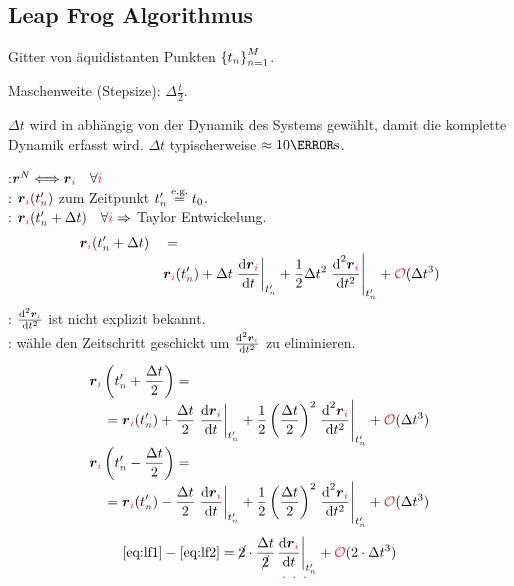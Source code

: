 \subsection{Leap Frog Algorithmus}
\label{subsec:LeapFrogAlgorithmus}
\begin{sectionbox}\nospacing
  \begin{numberlist}
    \item Gitter von äquidistanten Punkten $\left\{t_{\idxn}\right\}_{\idxn=1}^{M}$.
    \item Maschenweite (Stepsize): $\Delta \frac{t}{2}$.
    \item $\Delta t$ wird in abhängig von der Dynamik des Systems gewählt, damit die komplette Dynamik erfasst wird. $\Delta t$ typischerweise $\approx10\femto\second$.
  \end{numberlist}
  :\hfil$\rvec^N\hfil\Longleftrightarrow\hfil\rveci\quad\forall\idxi$\\
  : $\rveci(\tnp)$ zum Zeitpunkt $\tnp\eqs{\text{e.g.}}t_0$.\\
  : $\rveci(\tnp+\Delta t)\quad\forall\idxi\Rightarrow$ Taylor Entwickelung.
  \begin{alignat*}{3}
    &\rveci(\tnp+\Delta t)&&=\nalign
                            &&&\rveci(\tnp)+\Delta t\left.\difrac{\rveci}{t}\right\rvert_{\tnp}+\frac{1}{2}\Delta t^2\left.\frac{\diff^2\rveci}{\diff t^2}\right\rvert_{\tnp}+\bigO{\Delta t^3}
  \end{alignat*}
  : $\frac{\diff^2\rveci}{\diff t^2}$ ist nicht explizit bekannt.\\
  : wähle den Zeitschritt geschickt um $\frac{\diff^2\rveci}{\diff t^2}$ zu eliminieren.
  \begin{alignat}{2}
    &\rveci\left(\tnp+\frac{\Delta t}{2}\right)=\label{eq:lf1}\nalign
                            &\quad=\rveci(\tnp)+\frac{\Delta t}{2}\left.\difrac{\rveci}{t}\right\rvert_{\tnp}+\frac{1}{2}\left(\frac{\Delta t}{2}\right)^2\left.\frac{\diff^2\rveci}{\diff t^2}\right\rvert_{\tnp}+\bigO{\Delta t^3}\nonumber\nalign
    &\rveci\left(\tnp-\frac{\Delta t}{2}\right)=\label{eq:lf2}\nalign
                            &\quad=\rveci(\tnp)-\frac{\Delta t}{2}\left.\difrac{\rveci}{t}\right\rvert_{\tnp}+\frac{1}{2}\left(\frac{\Delta t}{2}\right)^2\left.\frac{\diff^2\rveci}{\diff t^2}\right\rvert_{\tnp}+\bigO{\Delta t^3}\nonumber
  \end{alignat}
  \begin{alignat*}{2}
    &\cref{eq:lf1}-\cref{eq:lf2}=\cancel{2}\cdot\frac{\Delta t}{\cancel{2}}\uldotted{\left.\difrac{\rveci}{t}\right\rvert_{\tnp}}+\bigO{2\cdot\Delta t^3}\nalign

\end{alignat*}
\end{sectionbox}
